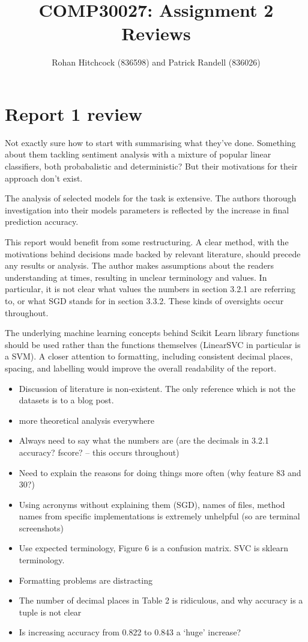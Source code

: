 \documentclass[11pt]{article}
\newcommand{\drafting}[1]{\textcolor{OliveGreen}{#1}}
\begin{document}
\title{\textbf{COMP30027: Assignment 2 Reviews}}
\author{Rohan Hitchcock (836598) and Patrick Randell (836026)}
\date{}
\maketitle

\section*{Report 1 review}

\drafting{
Not exactly sure how to start with summarising what they've done. Something about them tackling sentiment analysis with a mixture of popular linear classifiers, both probabalistic and deterministic? But their motivations for their approach don't exist.
}

The analysis of selected models for the task is extensive. The authors thorough investigation into their models parameters is reflected by the increase in final prediction accuracy.

This report would benefit from some restructuring. A clear method, with the motivations behind decisions made backed by relevant literature, should precede any results or analysis.
The author makes assumptions about the readers understanding at times, resulting in unclear terminology and values. In particular, it is not clear what values the numbers in section 3.2.1 are referring to, or what SGD stands for in section 3.3.2. These kinds of oversights occur throughout.

The underlying machine learning concepts behind Scikit Learn library functions should be used rather than the functions themselves (LinearSVC in particular is a SVM).
A closer attention to formatting, including consistent decimal places, spacing, and labelling would improve the overall readability of the report.

\begin{itemize}
    \item Discussion of literature is non-existent. The only reference which is not the datasets is to a blog post.
    \item more theoretical analysis everywhere 
    \item Always need to say what the numbers are (are the decimals in 3.2.1 accuracy? fscore? -- this occurs throughout)
    \item Need to explain the reasons for doing things more often (why feature 83 and 30?) 
    \item Using acronyms without explaining them (SGD), names of files, method names from specific implementations is extremely unhelpful (so are terminal screenshots)
    \item Use expected terminology, Figure 6 is a confusion matrix. SVC is sklearn terminology.
    \item Formatting problems are distracting 
    \item The number of decimal places in Table 2 is ridiculous, and why accuracy is a tuple is not clear
    \item Is increasing accuracy from 0.822 to 0.843 a `huge' increase?
\end{itemize}
\end{document}
